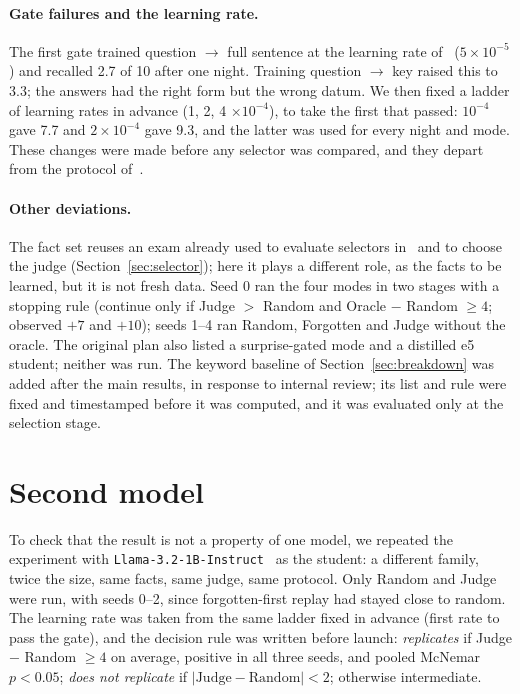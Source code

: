 \documentclass[11pt,a4paper]{article}
\begin{document}
\paragraph{Gate failures and the learning rate.}
The first gate trained question $\to$ full sentence at the learning rate of~\cite{goin2026surprise} ($5{\times}10^{-5}$) and recalled 2.7 of 10 after one night.
Training question $\to$ key raised this to 3.3; the answers had the right form but the wrong datum.
We then fixed a ladder of learning rates in advance (1, 2, 4 $\times 10^{-4}$), to take the first that passed: $10^{-4}$ gave 7.7 and $2{\times}10^{-4}$ gave 9.3, and the latter was used for every night and mode.
These changes were made before any selector was compared, and they depart from the protocol of~\cite{goin2026surprise}.

\paragraph{Other deviations.}
The fact set reuses an exam already used to evaluate selectors in~\cite{goin2026surprise} and to choose the judge (Section~\ref{sec:selector}); here it plays a different role, as the facts to be learned, but it is not fresh data.
Seed 0 ran the four modes in two stages with a stopping rule (continue only if Judge $>$ Random and Oracle $-$ Random $\geq 4$; observed $+7$ and $+10$); seeds 1--4 ran Random, Forgotten and Judge without the oracle.
The original plan also listed a surprise-gated mode and a distilled e5 student; neither was run.
The keyword baseline of Section~\ref{sec:breakdown} was added after the main results, in response to internal review; its list and rule were fixed and timestamped before it was computed, and it was evaluated only at the selection stage.

\section{Second model}
\label{sec:second}

To check that the result is not a property of one model, we repeated the experiment with \texttt{Llama-3.2-1B-Instruct}~\cite{meta2024llama32} as the student: a different family, twice the size, same facts, same judge, same protocol.
Only Random and Judge were run, with seeds 0--2, since forgotten-first replay had stayed close to random.
The learning rate was taken from the same ladder fixed in advance (first rate to pass the gate), and the decision rule was written before launch: \emph{replicates} if Judge $-$ Random $\geq 4$ on average, positive in all three seeds, and pooled McNemar $p<0.05$; \emph{does not replicate} if $|\text{Judge}-\text{Random}|<2$; otherwise intermediate.
\end{document}
